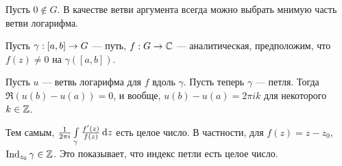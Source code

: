 \documentclass[a4paper]{report}
\begin{document}
    Пусть $0 \notin G$.
    В качестве ветви аргумента всегда можно выбрать мнимую часть ветви логарифма.

    Пусть $\gamma: [a, b] \rightarrow G$ --- путь, $f: G \rightarrow \mathbb{C}$ --- аналитическая, предположим, что $f(z) \ne 0$ на $\gamma([a, b])$.

    Пусть $u$ --- ветвь логарифма для $f$ вдоль $\gamma$.
    Пусть теперь $\gamma$ --- петля.
    Тогда $\Re(u(b) - u(a)) = 0$, и вообще, $u(b) - u(a) = 2\pi i k$ для некоторого $k \in \mathbb{Z}$.
    
    Тем самым, $\frac1{2\pi i}\int\limits_{\gamma} \frac{f'(z)}{f(z)}\operatorname{d}\! z$ есть целое число.
    В частности, для $f(z) = z - z_0$, $\operatorname{Ind}_{z_0} \gamma \in \mathbb{Z}$.
    Это показывает, что индекс петли есть целое число.\label{index-properties}
\end{document}
